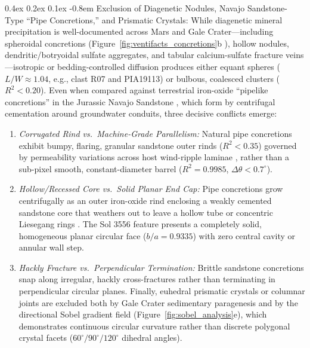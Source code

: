 \documentclass[11pt,a4paper]{article}
\makeatletter
\renewcommand\paragraph{\@startsection{paragraph}{4}{\z@}%
                                    {0.4ex \@plus 0.2ex \@minus 0.1ex}%
                                    {-0.8em}%
                                    {\normalfont\normalsize\bfseries}}
\makeatother
\begin{document}
\paragraph{Exclusion of Diagenetic Nodules, Navajo Sandstone-Type ``Pipe Concretions,'' and Prismatic Crystals:} While diagenetic mineral precipitation is well-documented across Mars and Gale Crater---including spheroidal concretions (Figure~\ref{fig:ventifacts_concretions}b \cite{pia19113}), hollow nodules, dendritic/botryoidal sulfate aggregates, and tabular calcium-sulfate fracture veins \cite{grotzinger2014,sun2019,nachon2017,kronyak2019}---isotropic or bedding-controlled diffusion produces either equant spheres ($L/W \approx 1.04$, e.g., clast R07 and PIA19113) or bulbous, coalesced clusters ($R^2 < 0.20$). Even when compared against terrestrial iron-oxide ``pipelike concretions'' in the Jurassic Navajo Sandstone \cite{chan2004,loope2011}, which form by centrifugal cementation around groundwater conduits, three decisive conflicts emerge:
\begin{enumerate}
	\item \textit{Corrugated Rind vs.\ Machine-Grade Parallelism:} Natural pipe concretions exhibit bumpy, flaring, granular sandstone outer rinds ($R^2 < 0.35$) governed by permeability variations across host wind-ripple laminae \cite{loope2011}, rather than a sub-pixel smooth, constant-diameter barrel ($R^2 = 0.9985$, $\Delta\theta < 0.7^\circ$).
	\item \textit{Hollow/Recessed Core vs.\ Solid Planar End Cap:} Pipe concretions grow centrifugally as an outer iron-oxide rind enclosing a weakly cemented sandstone core that weathers out to leave a hollow tube or concentric Liesegang rings \cite{loope2011}. The Sol 3556 feature presents a completely solid, homogeneous planar circular face ($b/a = 0.9335$) with zero central cavity or annular wall step.
	\item \textit{Hackly Fracture vs.\ Perpendicular Termination:} Brittle sandstone concretions snap along irregular, hackly cross-fractures rather than terminating in perpendicular circular planes. Finally, euhedral prismatic crystals or columnar joints are excluded both by Gale Crater sedimentary paragenesis and by the directional Sobel gradient field (Figure~\ref{fig:sobel_analysis}e), which demonstrates continuous circular curvature rather than discrete polygonal crystal facets ($60^\circ/90^\circ/120^\circ$ dihedral angles).
\end{enumerate}
\end{document}
